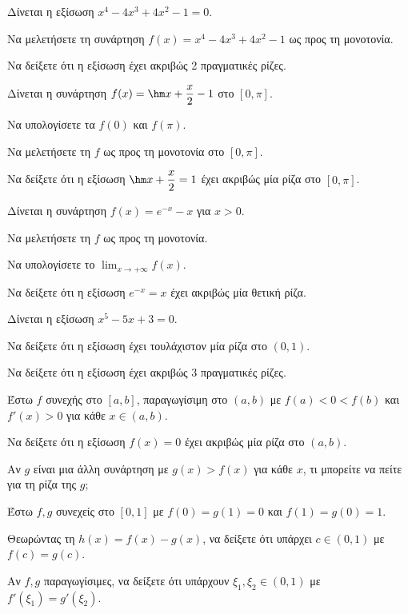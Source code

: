 \documentclass[11pt,a4paper,modern]{FFExercises}
\begin{document}
\askhsh
Δίνεται η εξίσωση $x^4 - 4x^3 + 4x^2 - 1 = 0$.
\begin{alist}
  \item Να μελετήσετε τη συνάρτηση $f(x) = x^4 - 4x^3 + 4x^2 - 1$ ως προς τη μονοτονία.
  \item Να δείξετε ότι η εξίσωση έχει ακριβώς 2 πραγματικές ρίζες.
\end{alist}

\askhsh
Δίνεται η συνάρτηση $f(x) = \hm x + \dfrac{x}{2} - 1$ στο $[0, \pi]$.
\begin{alist}
  \item Να υπολογίσετε τα $f(0)$ και $f(\pi)$.
  \item Να μελετήσετε τη $f$ ως προς τη μονοτονία στο $[0, \pi]$.
  \item Να δείξετε ότι η εξίσωση $\hm x + \dfrac{x}{2} = 1$ έχει ακριβώς μία ρίζα στο $[0, \pi]$.
\end{alist}

\askhsh
Δίνεται η συνάρτηση $f(x) = e^{-x} - x$ για $x > 0$.
\begin{alist}
  \item Να μελετήσετε τη $f$ ως προς τη μονοτονία.
  \item Να υπολογίσετε το $\displaystyle\lim_{x \to +\infty} f(x)$.
  \item Να δείξετε ότι η εξίσωση $e^{-x} = x$ έχει ακριβώς μία θετική ρίζα.
\end{alist}

\askhsh
Δίνεται η εξίσωση $x^5 - 5x + 3 = 0$.
\begin{alist}
  \item Να δείξετε ότι η εξίσωση έχει τουλάχιστον μία ρίζα στο $(0, 1)$.
  \item Να δείξετε ότι η εξίσωση έχει ακριβώς 3 πραγματικές ρίζες.
\end{alist}


\askhsh
Έστω $f$ συνεχής στο $[a, b]$, παραγωγίσιμη στο $(a, b)$ με $f(a) < 0 < f(b)$ και $f'(x) > 0$ για κάθε $x \in (a, b)$.
\begin{alist}
  \item Να δείξετε ότι η εξίσωση $f(x) = 0$ έχει ακριβώς μία ρίζα στο $(a, b)$.
  \item Αν $g$ είναι μια άλλη συνάρτηση με $g(x) > f(x)$ για κάθε $x$, τι μπορείτε να πείτε για τη ρίζα της $g$;
\end{alist}

\askhsh
Έστω $f, g$ συνεχείς στο $[0, 1]$ με $f(0) = g(1) = 0$ και $f(1) = g(0) = 1$.
\begin{alist}
  \item Θεωρώντας τη $h(x) = f(x) - g(x)$, να δείξετε ότι υπάρχει $c \in (0, 1)$ με $f(c) = g(c)$.
  \item Αν $f, g$ παραγωγίσιμες, να δείξετε ότι υπάρχουν $\xi_1, \xi_2 \in (0, 1)$ με $f'(\xi_1) = g'(\xi_2)$.
\end{alist}
\end{document}
